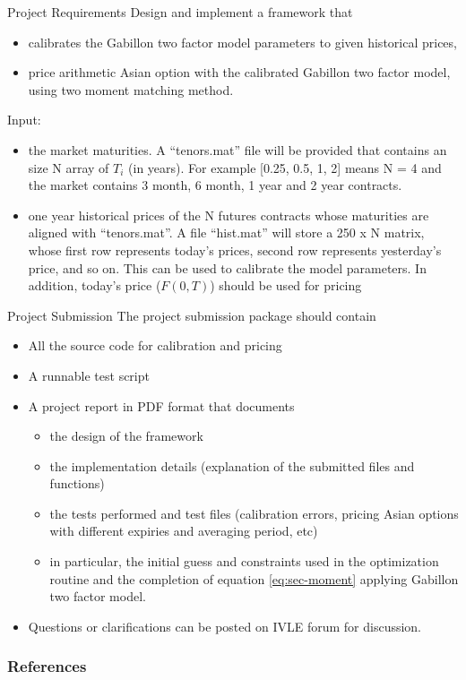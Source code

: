 \documentclass[11pt]{beamer}
\begin{document}
\begin{frame}{Project Requirements}
Design and implement a framework that 
\begin{itemize}
\item calibrates the Gabillon two factor model parameters to given historical prices,
\item price arithmetic Asian option with the calibrated Gabillon two factor model, using two moment matching method.
\end{itemize}

Input:
\begin{itemize}
\item the market maturities. A ``tenors.mat'' file will be provided that contains an size N array of $T_i$ (in years). For example [0.25, 0.5, 1, 2] means N = 4 and the market contains 3 month, 6 month, 1 year and 2 year contracts.
\item one year historical prices of the N futures contracts whose maturities are aligned with ``tenors.mat''.
A file ``hist.mat'' will store a 250 x N matrix, whose first row represents today's prices, second row represents yesterday's price, and so on. This can be used to calibrate the model parameters. In addition, today's price ($F(0, T)$) should be used for pricing 
\end{itemize}
\end{frame}

\begin{frame}{Project Submission}
The project submission package should contain
\begin{itemize}
\item All the source code for calibration and pricing
\item A runnable test script
\item A project report in PDF format that documents
\begin{itemize}
\item the design of the framework
\item the implementation details (explanation of the submitted files and functions)
\item the tests performed and test files (calibration errors, pricing Asian options with different expiries and averaging period, etc)
\item in particular, the initial guess and constraints used in the optimization routine and the completion of equation \eqref{eq:sec-moment} applying Gabillon two factor model.
\end{itemize}
\item Questions or clarifications can be posted on IVLE forum for discussion.
\end{itemize}
\end{frame}

\begin{frame}[allowframebreaks]
        \frametitle{References}
        
        
\end{frame}
\end{document}

